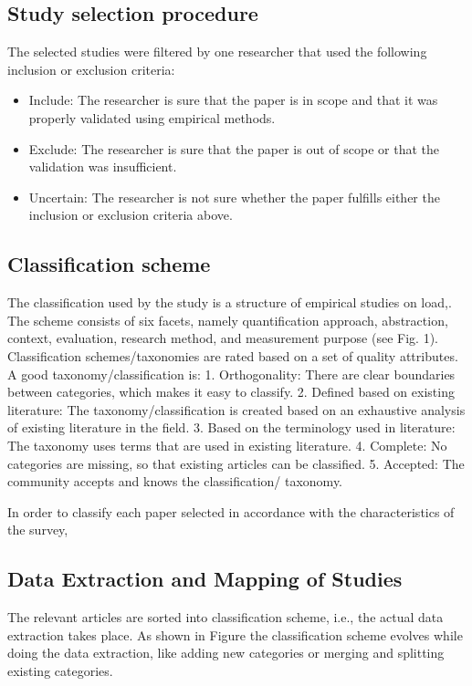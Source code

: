 \subsection{Study selection procedure}

The selected studies were filtered by one researcher that used the following inclusion or exclusion criteria:

\begin{itemize}
\item Include: The researcher is sure that the paper is in scope and that it was properly validated using empirical methods.
\item Exclude: The researcher is sure that the paper is out of scope or that the validation was insufficient.
\item Uncertain: The researcher is not sure whether the paper fulfills either the inclusion or exclusion criteria above.
\end{itemize}


\subsection{Classification scheme}

The classification used by the study  is a structure of empirical studies on load,. The scheme consists of six facets, namely quantification approach, abstraction, context, evaluation, research method, and measurement purpose (see Fig. 1). Classification schemes/taxonomies are rated based on a set of quality attributes. A good taxonomy/classification is:
1. Orthogonality: There are clear boundaries between categories, which makes it easy to classify.
2. Defined based on existing literature: The taxonomy/classification is created based on an exhaustive analysis of existing literature in the field.
3. Based on the terminology used in literature: The taxonomy uses terms that are used in existing literature.
4. Complete: No categories are missing, so that existing articles can be classified.
5. Accepted: The community accepts and knows the classification/ taxonomy.


In order to classify each paper selected in accordance with the characteristics of the survey, 



\subsection{Data Extraction and Mapping of Studies}

The relevant articles are sorted into classification scheme, i.e., the actual data extraction takes place. As shown in Figure  the classification scheme evolves while doing the data extraction, like adding new categories or merging and splitting existing categories. 


